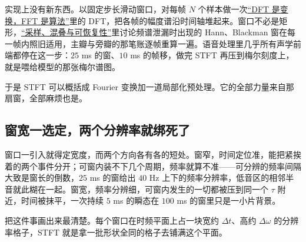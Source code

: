 实现上没有新东西。以固定步长滑动窗口，对每帧 \(N\) 个样本做一次\hyperref[sec:08-Numerical-Analysis/08-Fourier-and-Spectral-Methods/03]{``DFT 是变换，FFT 是算法''}里的 DFT，把各帧的幅度谱沿时间轴堆起来。窗口不必是矩形，\hyperref[sec:08-Numerical-Analysis/08-Fourier-and-Spectral-Methods/02]{``采样、混叠与可恢复性''}里讨论频谱泄漏时出现的 Hann、Blackman 窗在每一帧内照旧适用，主瓣与旁瓣的那笔账逐帧重算一遍。语音处理里几乎所有声学前端都停在这一步：\(25\) ms 的窗、\(10\) ms 的帧移，做完 STFT 再压到梅尔刻度上，就是喂给模型的那张梅尔谱图。

于是 STFT 可以概括成 Fourier 变换加一道局部化预处理。它的全部力量来自那扇窗，全部麻烦也是。

\subsection{窗宽一选定，两个分辨率就绑死了}

窗口一引入就得定宽度，而两个方向各有各的短处。窗窄，时间定位准，能把紧挨着的两个事件分开；可窗内装不下几个周期，频率就算不准——可分辨的频率间隔大致是窗长的倒数，\(25\) ms 的窗给出 \(40\) Hz 上下的频率分辨率，低音区的相邻半音就此糊在一起。窗宽，频率分辨细，可窗内发生的一切都被压到同一个 \(\tau\) 附近，时间被抹平，一次持续 \(5\) ms 的瞬态在 \(100\) ms 的窗里只是一小片背景。

把这件事画出来最清楚。每个窗口在时频平面上占一块宽约 \(\Delta t\)、高约 \(\Delta\omega\) 的分辨率格子，STFT 就是拿一批形状全同的格子去铺满这个平面。

